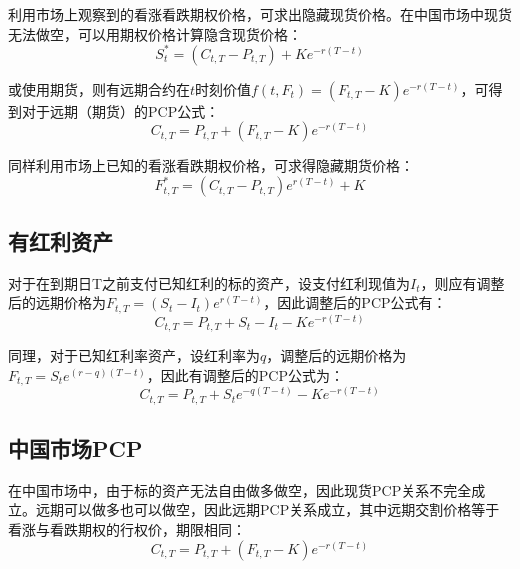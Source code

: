 \documentclass[11pt]{article}
\begin{document}
利用市场上观察到的看涨看跌期权价格，可求出隐藏现货价格。在中国市场中现货无法做空，可以用期权价格计算隐含现货价格：
\begin{equation*}
    S^*_t = \left( C_{t,T} - P_{t,T} \right) + K e^{-r(T-t)}
\end{equation*}

或使用期货，则有远期合约在$t$时刻价值$f(t,F_t) = (F_{t,T} - K) e^{-r(T-t)}$，可得到对于远期（期货）的PCP公式：
\begin{equation*}
    C_{t,T} = P_{t,T} + \left( F_{t,T} - K \right) e^{-r(T-t)}
\end{equation*}

同样利用市场上已知的看涨看跌期权价格，可求得隐藏期货价格：
\begin{equation*}
    F^*_{t,T} = \left( C_{t,T} - P_{t,T} \right) e^{r(T-t)} + K
\end{equation*}

\subsection{有红利资产}

对于在到期日T之前支付已知红利的标的资产，设支付红利现值为$I_t$，则应有调整后的远期价格为$F_{t,T} = (S_t - I_t)e^{r(T-t)}$，因此调整后的PCP公式有：
\begin{equation*}
    C_{t,T} = P_{t,T} + S_t - I_t - Ke^{-r(T-t)}
\end{equation*}

同理，对于已知红利率资产，设红利率为$q$，调整后的远期价格为$F_{t,T} = S_t e^{(r-q)(T-t)}$，因此有调整后的PCP公式为：
\begin{equation*}
    C_{t,T} = P_{t,T} + S_t e^{-q(T-t)} - Ke^{-r(T-t)}
\end{equation*}

\subsection{中国市场PCP}

在中国市场中，由于标的资产无法自由做多做空，因此现货PCP关系不完全成立。远期可以做多也可以做空，因此远期PCP关系成立，其中远期交割价格等于看涨与看跌期权的行权价，期限相同：
\begin{equation*}
    C_{t,T} = P_{t,T} + \left( F_{t,T} - K \right) e^{-r(T-t)}
\end{equation*}
\end{document}
